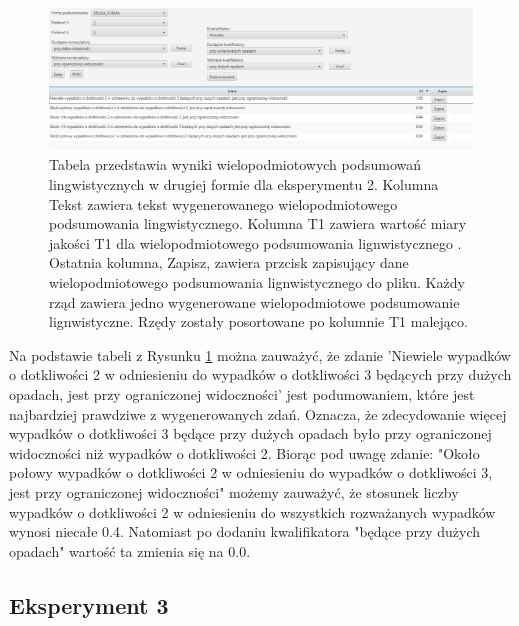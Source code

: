 \documentclass{classrep}
\begin{document}
\newpage

\begin{figure}[h!]
 \centering
 \includegraphics[width=15cm]{ex_wiel2_2.png}
 \vspace{-0.3cm}
 \caption{Tabela przedstawia wyniki wielopodmiotowych podsumowań lingwistycznych w drugiej formie dla eksperymentu 2. Kolumna Tekst zawiera tekst wygenerowanego wielopodmiotowego podsumowania lingwistycznego. Kolumna T1 zawiera wartość miary jakości T1 dla wielopodmiotowego podsumowania lignwistycznego \cite{niewiadomski19}. Ostatnia kolumna, Zapisz, zawiera przcisk zapisujący dane wielopodmiotowego podsumowania lignwistycznego do pliku. Każdy rząd zawiera jedno wygenerowane wielopodmiotowe podsumowanie lignwistyczne. Rzędy zostały posortowane po kolumnie T1 malejąco.  }
 \label{wykr_ex_wiel2_2}
\end{figure}



Na podstawie tabeli z Rysunku \ref{wykr_ex_wiel2_2} można zauważyć, że zdanie 'Niewiele wypadków o dotkliwości 2 w odniesieniu do wypadków o dotkliwości 3 będących przy dużych opadach, jest przy ograniczonej widoczności' jest podumowaniem, które jest najbardziej prawdziwe z wygenerowanych zdań. Oznacza, że zdecydowanie więcej wypadków o dotkliwości 3 będące przy dużych opadach było przy ograniczonej widoczności niż wypadków o dotkliwości 2. Biorąc pod uwagę zdanie: "Około połowy wypadków o dotkliwości 2 w odniesieniu do wypadków o dotkliwości 3, jest przy ograniczonej widoczności" możemy zauważyć, że stosunek liczby wypadków o dotkliwości 2 w odniesieniu do wszystkich rozważanych wypadków wynosi niecałe 0.4. Natomiast po dodaniu kwalifikatora "będące przy dużych opadach" wartość ta zmienia się na 0.0. 





\newpage
\subsection{Eksperyment 3}
\label{section:ex_wiel3}
\end{document}
